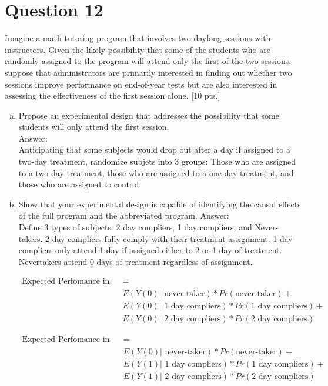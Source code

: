 \documentclass[11pt,notitlepage]{article}\usepackage[]{graphicx}\usepackage[]{color}
\begin{document}
\section*{Question 12}
Imagine a math tutoring program that involves two daylong sessions with instructors. Given the likely possibility that some of the students who are randomly assigned to the program will attend only the first of the two sessions, suppose that administrators are primarily interested in finding out whether two sessions improve performance on end-of-year tests but are also interested in assessing the effectiveness of the first session alone. [10 pts.]


\begin{enumerate}[a)]
\item Propose an experimental design that addresses the possibility that some students
will only attend the first session.\\
Answer:\\
Anticipating that some subjects would drop out after a day if assigned to a two-day treatment, randomize subjets into 3 groups:  Those who are assigned to a two day treatment, those who are assigned to a one day treatment, and those who are assigned to control.  

\item Show that your experimental design is capable of identifying the causal effects of the
full program and the abbreviated program.
Answer:\\
Define 3 types of subjects: 2 day compliers, 1 day compliers, and Never-takers.  2 day compliers fully comply with their treatment assignment.  1 day compliers only attend 1 day if assigned either to 2 or 1 day of treatment.  Nevertakers attend 0 days of treatment regardless of assignment.

\begin{align*}
\text{Expected Perfomance in Control (EP, Control)} &= \\
&E(Y(0)|\text{ never-taker})*Pr(\text{never-taker}) + \\
&E(Y(0)|\text{ 1 day compliers})*Pr(\text{1 day compliers}) + \\
&E(Y(0)|\text{ 2 day compliers})*Pr(\text{2 day compliers})
\end{align*}

\begin{align*}
\text{Expected Perfomance in 1-day group (EP, 1-day)} &= \\
&E(Y(0)|\text{ never-taker})*Pr(\text{never-taker}) + \\
&E(Y(1)|\text{ 1 day compliers})*Pr(\text{1 day compliers}) + \\
&E(Y(1)|\text{ 2 day compliers})*Pr(\text{2 day compliers})
\end{align*}


\end{enumerate}
\end{document}
